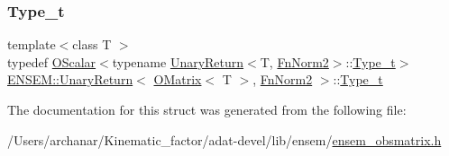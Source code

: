 \mbox{\label{structENSEM_1_1UnaryReturn_3_01OMatrix_3_01T_01_4_00_01FnNorm2_01_4_a4ec82ac7d8a71ef886cafde5b7ecff03}} 
\subsubsection{\texorpdfstring{Type\_t}{Type\_t}\hspace{0.1cm}{\footnotesize\ttfamily [3/3]}}
{\footnotesize\ttfamily template$<$class T $>$ \\
typedef \mbox{\hyperlink{classENSEM_1_1OScalar}{O\+Scalar}}$<$typename \mbox{\hyperlink{structENSEM_1_1UnaryReturn}{Unary\+Return}}$<$T, \mbox{\hyperlink{structENSEM_1_1FnNorm2}{Fn\+Norm2}}$>$\+::\mbox{\hyperlink{structENSEM_1_1UnaryReturn_3_01OMatrix_3_01T_01_4_00_01FnNorm2_01_4_a4ec82ac7d8a71ef886cafde5b7ecff03}{Type\+\_\+t}}$>$ \mbox{\hyperlink{structENSEM_1_1UnaryReturn}{E\+N\+S\+E\+M\+::\+Unary\+Return}}$<$ \mbox{\hyperlink{classENSEM_1_1OMatrix}{O\+Matrix}}$<$ T $>$, \mbox{\hyperlink{structENSEM_1_1FnNorm2}{Fn\+Norm2}} $>$\+::\mbox{\hyperlink{structENSEM_1_1UnaryReturn_3_01OMatrix_3_01T_01_4_00_01FnNorm2_01_4_a4ec82ac7d8a71ef886cafde5b7ecff03}{Type\+\_\+t}}}



The documentation for this struct was generated from the following file\+:\begin{DoxyCompactItemize}
\item 
/\+Users/archanar/\+Kinematic\+\_\+factor/adat-\/devel/lib/ensem/\mbox{\hyperlink{adat-devel_2lib_2ensem_2ensem__obsmatrix_8h}{ensem\+\_\+obsmatrix.\+h}}\end{DoxyCompactItemize}
